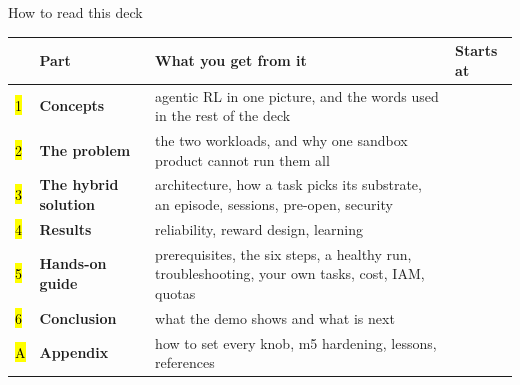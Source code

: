 \begin{frame}{How to read this deck}
\footnotesize\setlength{\tabcolsep}{5pt}
\begin{tabularx}{\textwidth}{@{}P{0.04\textwidth}P{0.22\textwidth}Y P{0.13\textwidth}@{}}
\toprule
& \textbf{Part} & \textbf{What you get from it} & \textbf{Starts at}\\
\midrule
\hl{1} & \textbf{Concepts} & agentic RL in one picture, and the words used in the rest of the deck & \\
\hl{2} & \textbf{The problem} & the two workloads, and why one sandbox product cannot run them all & \\
\hl{3} & \textbf{The hybrid solution} & architecture, how a task picks its substrate, an episode, sessions, pre-open, security & \\
\hl{4} & \textbf{Results} & reliability, reward design, learning & \\
\hl{5} & \textbf{Hands-on guide} & prerequisites, the six steps, a healthy run, troubleshooting, your own tasks, cost, IAM, quotas & \\
\hl{6} & \textbf{Conclusion} & what the demo shows and what is next & \\
\hl{A} & \textbf{Appendix} & how to set every knob, m5 hardening, lessons, references & \\
\bottomrule
\end{tabularx}
\par\vspace{3mm}
\begin{columns}[T]
\end{columns}
\end{frame}


